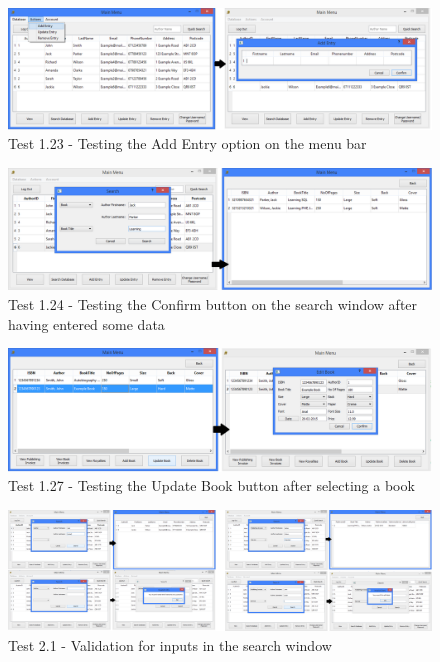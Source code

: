 \begin{landscape}
\begin{figure}[H]
    \includegraphics[width=\textwidth]{./Testing/Evidence/AddEntryMenuTest.png}
    \caption{Test 1.23 - Testing the Add Entry option on the menu bar}  \label{fig:AddEntryMenuTest}
\end{figure}

\begin{figure}[H]
    \includegraphics[width=\textwidth]{./Testing/Evidence/ConfirmSearchButtonTest.png}
    \caption{Test 1.24 - Testing the Confirm button on the search window after having entered some data}  \label{fig:ConfirmSearchButtonTest}
\end{figure}

\begin{figure}[H]
    \includegraphics[width=\textwidth]{./Testing/Evidence/UpdateBookButtonTest.png}
    \caption{Test 1.27 - Testing the Update Book button after selecting a book}  \label{fig:UpdateBookButtonTest}
\end{figure}

\begin{figure}[H]
    \includegraphics[width=\textwidth]{./Testing/Evidence/Series2/SearchValidation.png}
    \caption{Test 2.1 - Validation for inputs in the search window}  \label{fig:SearchValidation}
\end{figure}


\end{landscape}
